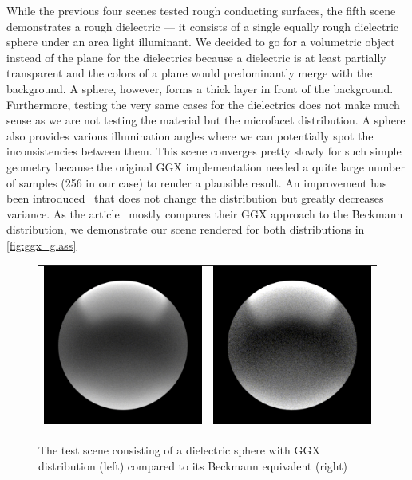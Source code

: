 While the previous four scenes tested rough conducting surfaces, the fifth scene demonstrates a rough dielectric --- it consists of a single equally rough dielectric sphere under an area light illuminant. We decided to go for a volumetric object instead of the plane for the dielectrics because a dielectric is at least partially transparent and the colors of a plane would predominantly merge with the background. A sphere, however, forms a thick layer in front of the background. Furthermore, testing the very same cases for the dielectrics does not make much sense as we are not testing the material but the microfacet distribution. A sphere also provides various illumination angles where we can potentially spot the inconsistencies between them. This scene converges pretty slowly for such simple geometry because the original GGX implementation needed a quite large number of samples (256 in our case) to render a plausible result. An improvement has been introduced~\cite{heitz2018sampling} that does not change the distribution but greatly decreases variance. As the article~\cite{walter2007microfacet} mostly compares their GGX approach to the Beckmann distribution, we demonstrate our scene rendered for both distributions in \autoref{fig:ggx_glass}

\begin{figure}[h]
	\begin{tabular}{cc}
		\includegraphics[width=.45\linewidth]{img/ggx_glass.png}
		&
		\includegraphics[width=.45\linewidth]{img/beckmann_glass.png}
	\end{tabular}
	\caption{The test scene consisting of a dielectric sphere with GGX distribution (left) compared to its Beckmann equivalent (right)}
	\label{fig:ggx_glass}
\end{figure}

